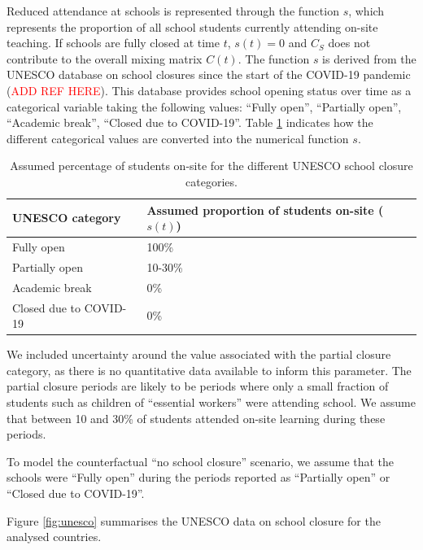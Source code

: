 Reduced attendance at schools is represented through the function $s$, which represents the proportion of all school students 
currently attending on-site teaching. If schools are fully closed at time $t$, \(s(t)=0\) and \(C_{S}\) does not contribute to the overall 
mixing matrix \(C(t)\). 
The function $s$ is derived from the UNESCO database on school closures since the start of the COVID-19 pandemic (\textcolor{red}{ADD REF HERE}).
This database provides school opening status over time as a categorical variable taking the following values: ``Fully open'', ``Partially open'', ``Academic break'', ``Closed due to COVID-19''.
Table \ref{tab:unesco_categories} indicates how the different categorical values are converted into the numerical function $s$.

\begin{table}[ht]  
  \begin{center}
      \begin{tabular}{p{5cm} | p{5cm}}
          \hline
          \textbf{UNESCO category} & \textbf{Assumed proportion of students on-site ($s(t)$)} \\
          \hline
          Fully open & 100\% \\
          Partially open & 10-30\% \\
          Academic break & 0\% \\
          Closed due to COVID-19 & 0\% \\
          \hline
      \end{tabular}
    \end{center}
      \caption{Assumed percentage of students on-site for the different UNESCO school closure categories.}
      \label{tab:unesco_categories}
  \end{table}

We included uncertainty around the value associated with the partial closure category, as there is no quantitative data available to 
inform this parameter. The partial closure periods are likely to be periods where only a small fraction of students such as children of ``essential workers'' were 
attending school. We assume that between 10 and 30\% of students attended on-site learning during these periods.

To model the counterfactual ``no school closure'' scenario, we assume that the schools were ``Fully open'' during the
periods reported as ``Partially open'' or ``Closed due to COVID-19''.

Figure \ref{fig:unesco} summarises the UNESCO data on school closure for the analysed countries.

